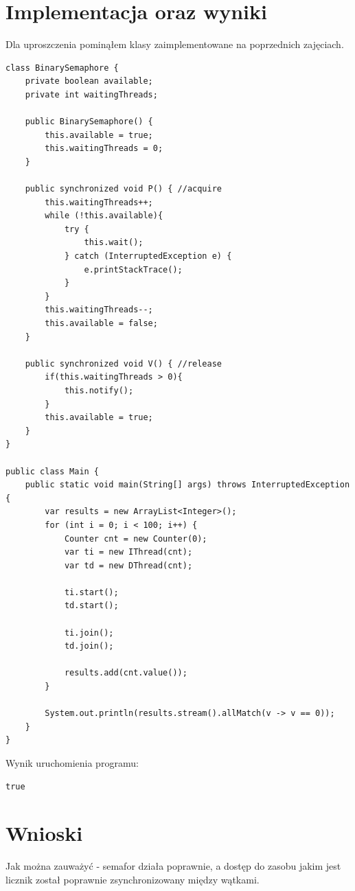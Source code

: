 \documentclass[12pt]{article}
\begin{document}
\section{Implementacja oraz wyniki}
Dla uproszczenia pominąłem klasy zaimplementowane na poprzednich zajęciach.

\begin{verbatim}
class BinarySemaphore {
    private boolean available;
    private int waitingThreads;

    public BinarySemaphore() {
        this.available = true;
        this.waitingThreads = 0;
    }

    public synchronized void P() { //acquire
        this.waitingThreads++;
        while (!this.available){
            try {
                this.wait();
            } catch (InterruptedException e) {
                e.printStackTrace();
            }
        }
        this.waitingThreads--;
        this.available = false;
    }

    public synchronized void V() { //release
        if(this.waitingThreads > 0){
            this.notify();
        }
        this.available = true;
    }
}

public class Main {
    public static void main(String[] args) throws InterruptedException {
        var results = new ArrayList<Integer>();
        for (int i = 0; i < 100; i++) {
            Counter cnt = new Counter(0);
            var ti = new IThread(cnt);
            var td = new DThread(cnt);

            ti.start();
            td.start();

            ti.join();
            td.join();

            results.add(cnt.value());
        }

        System.out.println(results.stream().allMatch(v -> v == 0));
    }
}
\end{verbatim}

Wynik uruchomienia programu:
\begin{verbatim}
true
\end{verbatim}


\section{Wnioski}
Jak można zauważyć - semafor działa poprawnie, a dostęp do zasobu jakim jest licznik został poprawnie zsynchronizowany między wątkami.


\newpage
\end{document}
